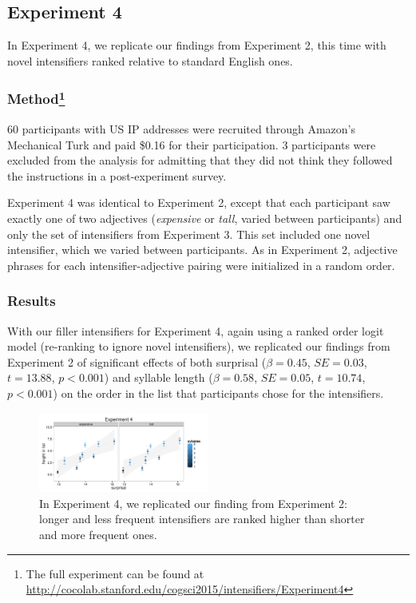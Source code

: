 \documentclass[10pt,letterpaper]{article}
\newcommand{\w}[1]{\emph{#1}}
\newcommand{\todo}[1]{{\color{red}#1}}
\begin{document}

\subsection{Experiment 4}

In Experiment 4, we replicate our findings from Experiment 2, this time with novel intensifiers ranked relative to standard English ones.

\subsubsection{Method\footnote{The full experiment can be found at \url{http://cocolab.stanford.edu/cogsci2015/intensifiers/Experiment4}}}
60 participants with US IP addresses were recruited through Amazon's Mechanical Turk and paid \$0.16 for their participation. 3 participants were excluded from the analysis for admitting that they did not think they followed the instructions in a post-experiment survey.

Experiment 4 was identical to Experiment 2, except that each participant saw exactly one of two adjectives (\w{expensive} or \w{tall}, varied between participants) and only the set of intensifiers from Experiment 3. This set included one novel intensifier, which we varied between participants. As in Experiment 2, adjective phrases for each intensifier-adjective pairing were initialized in a random order.

\subsubsection{Results}
With our filler intensifiers for Experiment 4, again using a ranked order logit model (re-ranking to ignore novel intensifiers), we replicated our findings from Experiment 2 of significant effects of both surprisal ($\beta=0.45$, $SE=0.03$, $t=13.88$, $p<0.001$)
and syllable length ($\beta=0.58$, $SE=0.05$, $t=10.74$, $p<0.001$) on the order in the list that participants chose for the intensifiers.

\begin{figure}[hbt]
\begin{center}
\includegraphics[width=0.5\textwidth]{../analysis/output/Experiment4/scatter.pdf}
\end{center}
\caption{In Experiment 4, we replicated our finding from Experiment 2: longer and less frequent intensifiers are ranked higher than shorter and more frequent ones.} 
\label{exp4_replication}
\end{figure}
\end{document}
